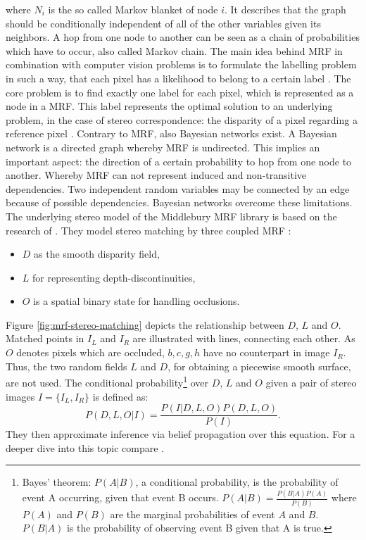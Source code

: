 \noindent where $N_i$ is the so called Markov blanket of node $i$.
It describes that the graph should be conditionally independent of all of the other variables given its neighbors.
A hop from one node to another can be seen as a chain of probabilities which have to occur, also called Markov chain.
The main idea behind MRF in combination with computer vision problems is to formulate the labelling problem in such a way, that each pixel has a likelihood to belong to a certain label \citep{tamassia2013handbook}.
The core problem is to find exactly one label for each pixel, which is represented as a node in a MRF.
This label represents the optimal solution to an underlying problem, in the case of stereo correspondence: the disparity of a pixel regarding a reference pixel \citep{cyganek2011introduction}.
\newline\newline\noindent Contrary to MRF, also Bayesian networks exist.
A Bayesian network is a directed graph whereby MRF is undirected.
This implies an important aspect: the direction of a certain probability to hop from one node to another.
Whereby MRF can not represent induced and non-transitive dependencies.
Two independent random variables may be connected by an edge because of possible dependencies.
Bayesian networks overcome these limitations.
\newline\newline\noindent The underlying stereo model of the Middlebury MRF library is based on the research of \citeauthor{sun2003stereo}.
They model stereo matching by three coupled MRF \citep{sun2003stereo}:
\begin{itemize}
  \item $D$ as the smooth disparity field,
  \item $L$ for representing depth-discontinuities,
  \item $O$ is a spatial binary state for handling occlusions.
\end{itemize}
\noindent Figure \ref{fig:mrf-stereo-matching} depicts the relationship between $D$, $L$ and $O$.
Matched points in $I_L$ and $I_R$ are illustrated with lines, connecting each other.
As $O$ denotes pixels which are occluded, $b, c, g, h$ have no counterpart in image $I_R$.
Thus, the two random fields $L$ and $D$, for obtaining a piecewise smooth surface, are not used.
The conditional probability\footnote{Bayes' theorem: $P(A|B)$, a conditional probability, is the probability of event A occurring, given that event B occurs. $P(A|B) = \frac{P(B|A)P(A)}{P(B)}$ where $P(A)$ and $P(B)$ are the marginal probabilities of event $A$ and $B$. $P(B|A)$ is the probability of observing event B given that A is true.} over $D$, $L$ and $O$ given a pair of stereo images $I = \{I_L,I_R\}$ is defined as:
\begin{equation}
  P(D,L,O|I) = \frac{P(I|D,L,O)P(D,L,O)}{P(I)}.
\end{equation}
They then approximate inference via belief propagation over this equation.
For a deeper dive into this topic compare \citep{sun2003stereo, tamassia2013handbook, cyganek2011introduction, yedidia2003understanding, boykov2001fast, kolmogorov2006convergent, wainwright2005map}.

